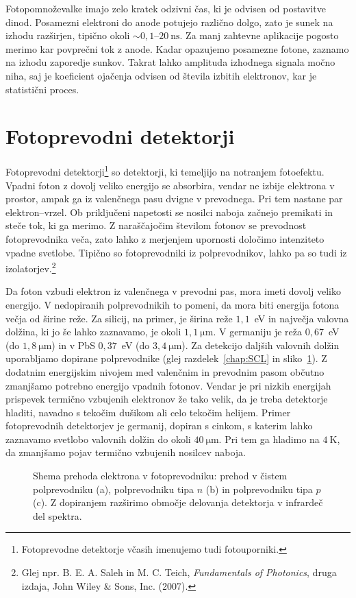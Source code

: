 Fotopomnoževalke imajo zelo kratek odzivni čas, ki je odvisen od postavitve dinod. Posamezni 
elektroni do anode potujejo različno dolgo, zato je sunek na izhodu 
razširjen, tipično okoli $\sim 0,1$--$20~\si{\nano\second}$.  
Za manj zahtevne aplikacije pogosto merimo kar povprečni tok z anode. Kadar opazujemo
posamezne fotone, zaznamo na izhodu zaporedje sunkov. Takrat lahko 
amplituda izhodnega signala močno niha, saj je koeficient ojačenja 
odvisen od števila izbitih elektronov, kar je statistični proces. 

\section{Fotoprevodni detektorji}
Fotoprevodni detektorji\footnote{Fotoprevodne detektorje včasih imenujemo tudi fotouporniki.} 
so detektorji, ki temeljijo na notranjem fotoefektu.
Vpadni foton z dovolj veliko energijo se absorbira, vendar ne izbije elektrona v prostor, 
ampak ga iz valenčnega pasu dvigne v prevodnega. Pri tem nastane par elektron--vrzel. 
Ob priključeni napetosti se nosilci naboja začnejo premikati in steče tok, 
ki ga merimo. Z naraščajočim številom fotonov se prevodnost fotoprevodnika veča, 
zato lahko z merjenjem upornosti določimo 
intenziteto vpadne svetlobe. Tipično so fotoprevodniki iz polprevodnikov, 
lahko pa so tudi iz izolatorjev.\footnote{Glej npr. 
B. E. A. Saleh in M. C. Teich, 
{\it Fundamentals of Photonics}, druga izdaja, John Wiley \& Sons, Inc. (2007).}

Da foton vzbudi elektron iz valenčnega v prevodni pas, mora imeti dovolj veliko energijo. 
V nedopiranih polprevodnikih to pomeni, da mora biti energija fotona večja od 
širine reže. Za silicij, na primer, je širina reže $1,1$~eV in največja
valovna dolžina, ki jo še lahko zaznavamo, je okoli 
$1,1~\si{\micro\meter}$. V germaniju je reža $0,67$~eV (do $1,8~\si{\micro\meter}$) in v 
PbS $0,37$~eV (do $3,4~\si{\micro\meter}$). 
Za detekcijo daljših valovnih dolžin uporabljamo dopirane 
polprevodnike (glej razdelek~\ref{chap:SCL} 
in sliko~\ref{fig:FPrevodnik}). 
Z dodatnim energijskim nivojem med valenčnim in prevodnim pasom občutno zmanjšamo 
potrebno energijo vpadnih fotonov. Vendar je pri  nizkih energijah prispevek termično 
vzbujenih elektronov že tako velik, da je treba detektorje hladiti, navadno s tekočim
dušikom ali celo tekočim helijem. Primer fotoprevodnih detektorjev je germanij, dopiran s cinkom, 
s katerim lahko zaznavamo svetlobo valovnih dolžin do okoli $40~\si{\micro\meter}$. Pri tem ga hladimo
na $4~\si{\kelvin}$, da zmanjšamo pojav termično vzbujenih nosilcev naboja. 
\begin{figure}[h]
\centering
\def\svgwidth{150truemm} 

\caption{Shema prehoda elektrona v fotoprevodniku: prehod v čistem polprevodniku (a), 
polprevodniku tipa $n$ (b) in polprevodniku tipa $p$ (c). 
Z dopiranjem razširimo območje delovanja detektorja v infrardeč del spektra. }
\label{fig:FPrevodnik}
\end{figure}

